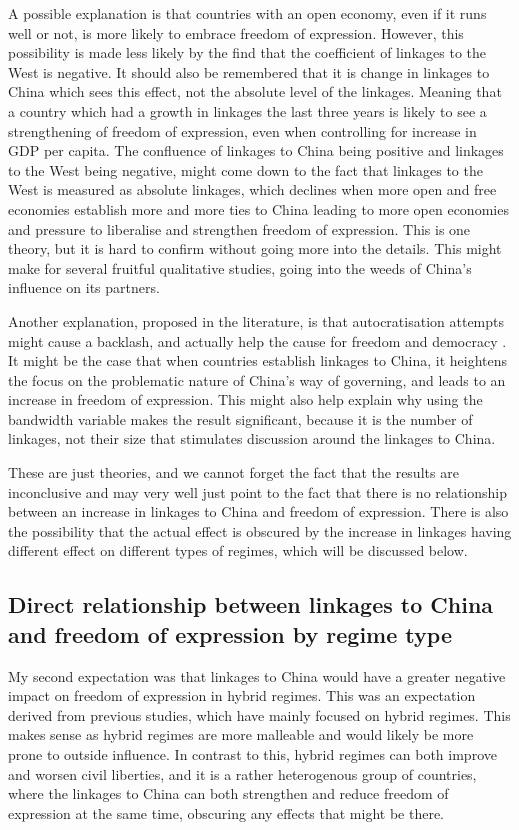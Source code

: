 A possible explanation is that countries with an open economy, even if it runs well or not, is more likely to embrace freedom of expression. However, this possibility is made less likely by the find that the coefficient of linkages to the West is negative. It should also be remembered that it is change in linkages to China which sees this effect, not the absolute level of the linkages. Meaning that a country which had a growth in linkages the last three years is likely to see a strengthening of freedom of expression, even when controlling for increase in GDP per capita. The confluence of linkages to China being positive and linkages to the West being negative, might come down to the fact that linkages to the West is measured as absolute linkages, which declines when more open and free economies establish more and more ties to China leading to more open economies and pressure to liberalise and strengthen freedom of expression. This is one theory, but it is hard to confirm without going more into the details. This might make for several fruitful qualitative studies, going into the weeds of China's influence on its partners.

Another explanation, proposed in the literature, is that autocratisation attempts might cause a backlash, and actually help the cause for freedom and democracy \citep{delcour_spoiler_2015, risse_democracy_2015, way_limits_2015}. It might be the case that when countries establish linkages to China, it heightens the focus on the problematic nature of China's way of governing, and leads to an increase in freedom of expression. This might also help explain why using the bandwidth variable makes the result significant, because it is the number of linkages, not their size that stimulates discussion around the linkages to China.

These are just theories, and we cannot forget the fact that the results are inconclusive and may very well just point to the fact that there is no relationship between an increase in linkages to China and freedom of expression. There is also the possibility that the actual effect is obscured by the increase in linkages having different effect on different types of regimes, which will be discussed below. 

\subsection{Direct relationship between linkages to China and freedom of expression by regime type}
My second expectation was that linkages to China would have a greater negative impact on freedom of expression in hybrid regimes. This was an expectation derived from previous studies, which have mainly focused on hybrid regimes. This makes sense as hybrid regimes are more malleable and would likely be more prone to outside influence. In contrast to this, hybrid regimes can both improve and worsen civil liberties, and it is a rather heterogenous group of countries, where the linkages to China can both strengthen and reduce freedom of expression at the same time, obscuring any effects that might be there.

